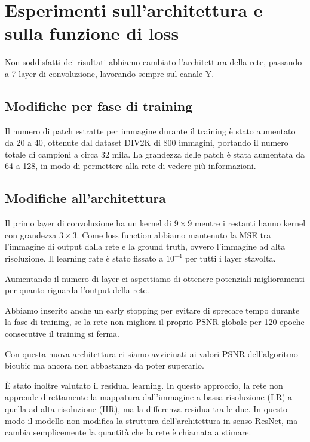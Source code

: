 \section{Esperimenti sull’architettura e sulla funzione di loss}

Non soddisfatti dei risultati abbiamo cambiato l'architettura della rete,
passando a 7 layer di convoluzione, lavorando sempre sul canale Y.

\subsection{Modifiche per fase di training}

Il numero di patch estratte per immagine durante il training è stato aumentato da 20 a 40,
ottenute dal dataset DIV2K di 800 immagini, portando il numero totale di campioni a circa 32 mila.
La grandezza delle patch è stata aumentata da 64 a 128,
in modo di permettere alla rete di vedere più informazioni.

\subsection{Modifiche all'architettura}
Il primo layer di convoluzione ha un kernel di $9\times9$ mentre i
restanti hanno kernel con grandezza $3\times3$.
Come loss function abbiamo mantenuto la MSE tra l'immagine di output
dalla rete e la ground truth, ovvero l'immagine ad alta risoluzione.
Il learning rate è stato fissato a $10^{-4}$ per tutti i layer stavolta.

Aumentando il numero di layer ci aspettiamo di
ottenere potenziali miglioramenti per quanto riguarda l'output della rete.

Abbiamo inserito anche un early stopping per evitare di sprecare tempo durante la fase di training, se la rete non migliora il proprio PSNR globale per 120 epoche consecutive il training si ferma.

Con questa nuova architettura ci siamo avvicinati ai valori PSNR dell'algoritmo bicubic ma ancora non abbastanza da poter superarlo.

È stato inoltre valutato il residual learning.
In questo approccio, la rete non apprende direttamente la mappatura dall’immagine a bassa risoluzione (LR) a quella ad alta risoluzione (HR),
ma la differenza residua tra le due.
In questo modo il modello non modifica la struttura dell’architettura in senso ResNet,
ma cambia semplicemente la quantità che la rete è chiamata a stimare.

